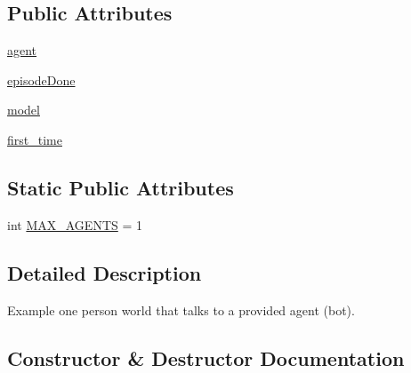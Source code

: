 \subsection*{Public Attributes}
\begin{DoxyCompactItemize}
\item 
\hyperlink{classparlai_1_1chat__service_1_1tasks_1_1chatbot_1_1worlds_1_1MessengerBotChatTaskWorld_aaf90973d4719a52bdf62d221d044399e}{agent}
\item 
\hyperlink{classparlai_1_1chat__service_1_1tasks_1_1chatbot_1_1worlds_1_1MessengerBotChatTaskWorld_a1dd84854cb60115df100f9a5610c4270}{episode\+Done}
\item 
\hyperlink{classparlai_1_1chat__service_1_1tasks_1_1chatbot_1_1worlds_1_1MessengerBotChatTaskWorld_aacaa2c91e062e4c8c2213391a40565f4}{model}
\item 
\hyperlink{classparlai_1_1chat__service_1_1tasks_1_1chatbot_1_1worlds_1_1MessengerBotChatTaskWorld_aeb63eec75493b0fb271a72a6425c81d8}{first\+\_\+time}
\end{DoxyCompactItemize}
\subsection*{Static Public Attributes}
\begin{DoxyCompactItemize}
\item 
int \hyperlink{classparlai_1_1chat__service_1_1tasks_1_1chatbot_1_1worlds_1_1MessengerBotChatTaskWorld_af56dca5416a2dea4ba34feebb5b81ffe}{M\+A\+X\+\_\+\+A\+G\+E\+N\+TS} = 1
\end{DoxyCompactItemize}


\subsection{Detailed Description}
\begin{DoxyVerb}Example one person world that talks to a provided agent (bot).
\end{DoxyVerb}
 

\subsection{Constructor \& Destructor Documentation}
\mbox{\label{classparlai_1_1chat__service_1_1tasks_1_1chatbot_1_1worlds_1_1MessengerBotChatTaskWorld_a5e7d694f09fe64607a3e0c8b19e5e893}} 
